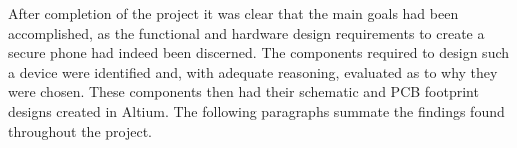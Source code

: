 	After completion of the project it was clear that the main goals had been accomplished, as the functional and hardware design requirements to create a secure phone had indeed been discerned. 
The components required to design such a device were identified and, with adequate reasoning, evaluated as to why they were chosen. 
These components then had their schematic and PCB footprint designs created in Altium. 
The following paragraphs summate the findings found throughout the project.\\





